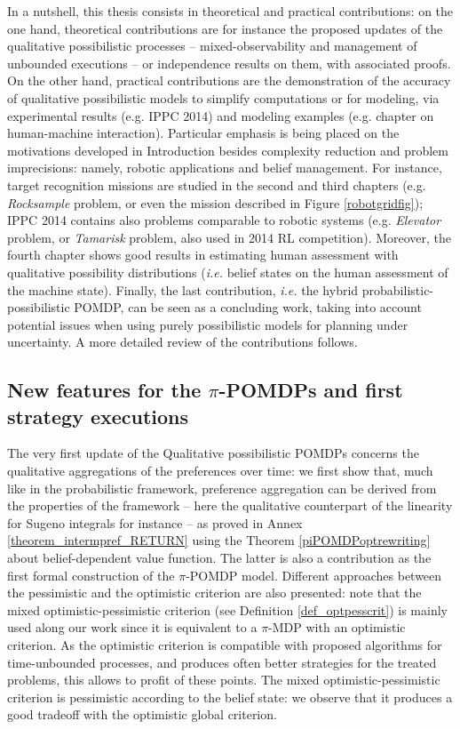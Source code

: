 In a nutshell, 
this thesis consists in
theoretical and practical contributions:
on the one hand, theoretical contributions 
are for instance 
the proposed updates of the qualitative possibilistic processes
-- mixed-observability and management of unbounded executions -- 
or independence results on them, with associated proofs.
On the other hand, 
practical contributions
are the demonstration of the accuracy 
of qualitative possibilistic models
to simplify computations or for modeling,
via experimental results (e.g. IPPC 2014) 
and modeling examples (e.g. chapter on human-machine interaction).
Particular emphasis is being placed 
on the motivations developed in Introduction
besides complexity reduction and problem imprecisions:
namely, robotic applications and belief management.
For instance, target recognition missions 
are studied in the second and third chapters 
(e.g. \textit{Rocksample} problem, 
or even the mission described in Figure \ref{robotgridfig});
IPPC 2014 contains also problems comparable to robotic systems 
(e.g. \textit{Elevator} problem, or \textit{Tamarisk} problem, also used in 2014 RL competition). 
Moreover, the fourth chapter shows good results 
in estimating human assessment with qualitative possibility distributions
(\textit{i.e.} belief states on the human assessment of the machine state).
Finally, the last contribution, 
\textit{i.e.} the hybrid probabilistic-possibilistic POMDP, 
can be seen as a concluding work, taking into account
potential issues when using purely possibilistic models 
for planning under uncertainty.
A more detailed review of the contributions follows.

\subsection*{New features for the $\pi$-POMDPs
and first strategy executions}
The very first update 
of the Qualitative possibilistic POMDPs \cite{Sabbadin:1999:pipomdp} 
concerns the qualitative aggregations 
of the preferences over time:
we first show that, 
much like in the probabilistic framework,
preference aggregation can be derived 
from the properties of the framework 
-- here the qualitative counterpart 
of the linearity
for Sugeno integrals for instance --
as proved in Annex \ref{theorem_intermpref_RETURN} 
using the Theorem \ref{piPOMDPoptrewriting} 
about belief-dependent value function.
The latter is also a contribution 
as the first formal construction
of the $\pi$-POMDP model.
Different approaches between the pessimistic and the optimistic criterion
are also presented: 
note that the mixed optimistic-pessimistic criterion 
(see Definition \ref{def_optpesscrit}) 
is mainly used along our work 
since it is equivalent to 
a $\pi$-MDP with an optimistic criterion.
As the optimistic criterion is compatible 
with proposed algorithms for time-unbounded processes,
and produces often better strategies 
for the treated problems,
this allows to profit of these points.
The mixed optimistic-pessimistic criterion 
is pessimistic according to the belief state:
we observe that it produces a good tradeoff
with the optimistic global criterion.

